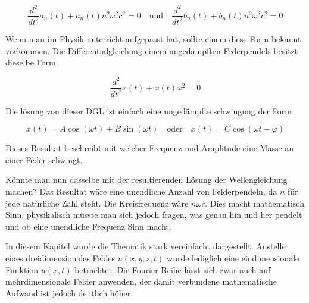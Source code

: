 \begin{equation}
	\frac{d^2}{dt^2} a_n(t) + a_n(t) n^2 \omega^2 c^2 = 0
	  \quad   \text{und} \quad  \frac{d^2}{dt^2} b_n(t) + b_n(t) n^2 \omega^2 c^2 = 0
\end{equation}

Wenn man im Physik unterricht aufgepasst hat, sollte einem diese Form bekannt vorkommen. Die Differentialgleichung einem ungedämpften Federpendels besitzt dieselbe Form. 

\begin{equation}
	\frac{d^2}{dt^2} x(t) + x(t) \omega^2  = 0
\end{equation}

Die lösung von dieser DGL ist einfach eine ungedämpfte schwingung der Form 

\begin{equation}
x(t) = A \cos(\omega t) + B \sin(\omega t) \quad \text{oder} \quad x(t) = C \cos(\omega t - \varphi)
\end{equation}

Dieses Resultat beschreibt mit welcher Frequenz und Amplitude eine Masse an einer Feder schwingt. 

Könnte man nun dasselbe mit der resultierenden Lösung der Wellengleichung machen?
Das Resultat wäre eine unendliche Anzahl von Felderpendeln, da $n$ für jede natürliche Zahl steht. 
Die Kreisfrequenz wäre  $n \omega c$. 
Dies macht mathematisch Sinn, physikalisch müsste man sich jedoch fragen, was genau hin und her pendelt und ob eine unendliche Frequenz Sinn macht.


In diesem Kapitel wurde die Thematik stark vereinfacht dargestellt. 
Anstelle eines dreidimensionales Feldes $u(x,y,z,t)$ wurde lediglich eine eindimensionale Funktion $u(x,t)$ betrachtet. Die Fourier-Reihe lässt sich zwar auch auf mehrdimensionale Felder anwenden, der damit verbundene mathematische Aufwand ist jedoch deutlich höher. 








